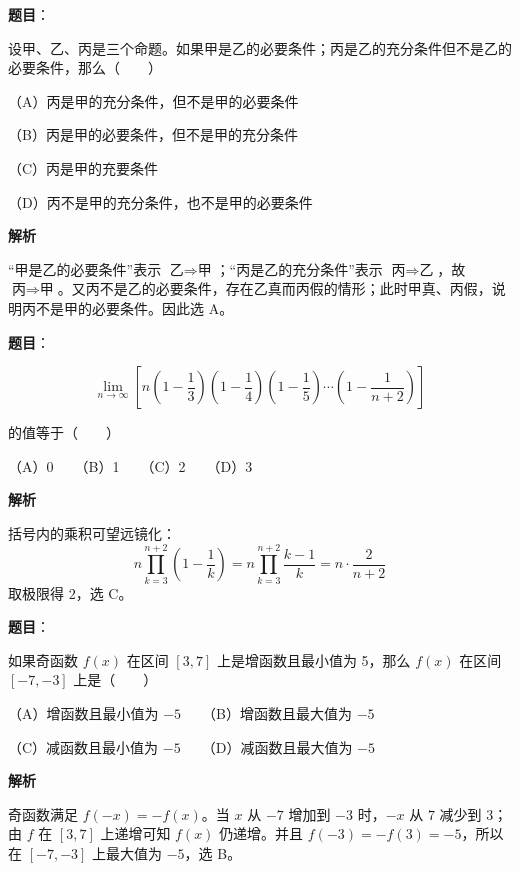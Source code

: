 \begin{answer}

\textbf{题目}：

设甲、乙、丙是三个命题。如果甲是乙的必要条件；丙是乙的充分条件但不是乙的必要条件，那么\mbox{（　　）}

（A）丙是甲的充分条件，但不是甲的必要条件

（B）丙是甲的必要条件，但不是甲的充分条件

（C）丙是甲的充要条件

（D）丙不是甲的充分条件，也不是甲的必要条件

\textbf{解析}

“甲是乙的必要条件”表示 $\text{乙}\Rightarrow\text{甲}$；“丙是乙的充分条件”表示 $\text{丙}\Rightarrow\text{乙}$，故 $\text{丙}\Rightarrow\text{甲}$。又丙不是乙的必要条件，存在乙真而丙假的情形；此时甲真、丙假，说明丙不是甲的必要条件。因此选 A。


\end{answer}
\begin{answer}

\textbf{题目}：

\nopagebreak[4]
\[
\lim_{n\to\infty}\left[n\left(1-\frac13\right)\left(1-\frac14\right)\left(1-\frac15\right)\cdots\left(1-\frac1{n+2}\right)\right]
\]

的值等于\mbox{（　　）}

（A）0　　（B）1　　（C）2　　（D）3

\textbf{解析}

括号内的乘积可望远镜化：
\nopagebreak[4]
\[
n\prod_{k=3}^{n+2}\left(1-\frac1k\right)
=n\prod_{k=3}^{n+2}\frac{k-1}{k}
=n\cdot\frac2{n+2}
\]
取极限得 $2$，选 C。


\end{answer}
\begin{answer}

\textbf{题目}：

如果奇函数 $f(x)$ 在区间 $[3,7]$ 上是增函数且最小值为 5，那么 $f(x)$ 在区间 $[-7,-3]$ 上是\mbox{（　　）}

（A）增函数且最小值为 $-5$　　（B）增函数且最大值为 $-5$

（C）减函数且最小值为 $-5$　　（D）减函数且最大值为 $-5$

\textbf{解析}

奇函数满足 $f(-x)=-f(x)$。当 $x$ 从 $-7$ 增加到 $-3$ 时，$-x$ 从 $7$ 减少到 $3$；由 $f$ 在 $[3,7]$ 上递增可知 $f(x)$ 仍递增。并且 $f(-3)=-f(3)=-5$，所以在 $[-7,-3]$ 上最大值为 $-5$，选 B。


\end{answer}
